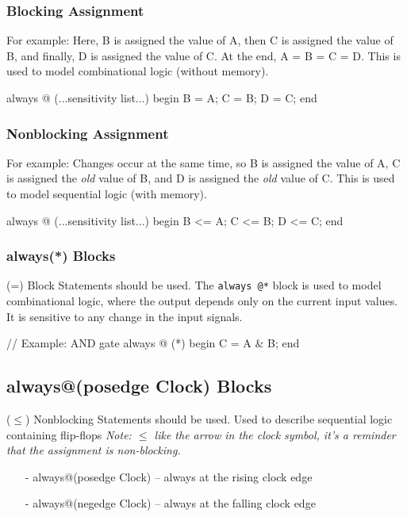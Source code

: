 \documentclass[12pt,openany]{book}
\begin{document}
\subsubsection{Blocking Assignment}
For example:
Here, B is assigned the value of A, then C is assigned the value of B, and finally, D is assigned the value of C. At the end, A = B = C = D.
This is used to model combinational logic (without memory).
\begin{vhdl}
always @ (...sensitivity list...)
begin
	B = A;
	C = B;
	D = C;
end
\end{vhdl}	
\subsubsection{Nonblocking Assignment}

For example:
Changes occur at the same time, so B is assigned the value of A, C is assigned the \textit{old} value of B, and D is assigned the \textit{old} value of C.
This is used to model sequential logic (with memory).
\begin{vhdl}
always @ (...sensitivity list...)
begin
	B <= A;
	C <= B;
	D <= C;
end
\end{vhdl}

\subsubsection{always(*) Blocks} 
(=) Block Statements should be used. \newline
The \texttt{always @*} block is used to model combinational logic, where the output depends only on the current input values. It is sensitive to any change in the input signals.
\begin{vhdl}
// Example: AND gate
always @ (*)
begin
	C = A & B;
end
\end{vhdl}
\subsection{always@(posedge Clock) Blocks}
($\leq$) Nonblocking Statements should be used. \newline
Used to describe sequential logic containing flip-flops \newline
\textit{Note: $\leq$ like the arrow in the clock symbol, it's a reminder that the assignment is non-blocking.}
\begin{itemize}
	\item[-] always@(posedge Clock) – always at the rising clock edge
	\item[-] always@(negedge Clock) – always at the falling clock edge
\end{itemize}
\vspace*{5px}
\end{document}

